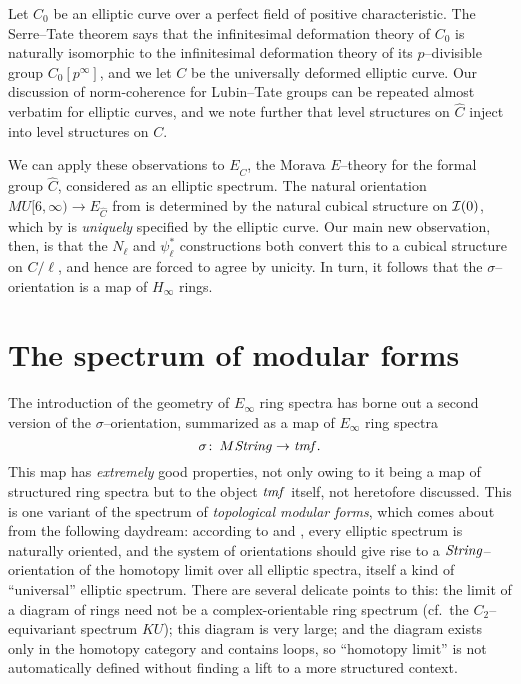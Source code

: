 \begin{example}
Let $C_0$ be an elliptic curve over a perfect field of positive characteristic.  The Serre--Tate theorem says that the infinitesimal deformation theory of $C_0$ is naturally isomorphic to the infinitesimal deformation theory of its $p$--divisible group $C_0[p^\infty]$, and we let $C$ be the universally deformed elliptic curve.  Our discussion of norm-coherence for Lubin--Tate groups can be repeated almost verbatim for elliptic curves, and we note further that level structures on $\widehat C$ inject into level structures on $C$.

We can apply these observations to $E_{\widehat C}$, the Morava $E$--theory for the formal group $\widehat C$, considered as an elliptic spectrum.  The natural orientation $MU[6, \infty) \to E_{\widehat C}$ from  is determined by the natural cubical structure on $\mathcal{I}(0)$, which by  is \emph{uniquely} specified by the elliptic curve.  Our main new observation, then, is that the $N_\ell$ and $\psi_\ell^*$ constructions both convert this to a cubical structure on $C / \ell$, and hence are forced to agree by unicity.  In turn, it follows that the $\sigma$--orientation is a map of $H_\infty$ rings.
\end{example}




















\section{The spectrum of modular forms}\label{ConstructionOfTMFSection}

The introduction of the geometry of $E_\infty$ ring spectra has borne out a second version of the $\sigma$--orientation, summarized as a map of $E_\infty$ ring spectra \[\sigma\colon\thinspace M\mathit{String} \to \mathit{tmf}.\]  This map has \emph{extremely} good properties, not only owing to it being a map of structured ring spectra but to the object $\mathit{tmf}$ itself, not heretofore discussed.  This is one variant of the spectrum of \textit{topological modular forms}, which comes about from the following daydream: according to  and , every elliptic spectrum is naturally oriented, and the system of orientations should give rise to a $\mathit{String}$--orientation of the homotopy limit over all elliptic spectra, itself a kind of ``universal'' elliptic spectrum.  There are several delicate points to this: the limit of a diagram of rings need not be a complex-orientable ring spectrum (cf.\ the $C_2$--equivariant spectrum $KU$); this diagram is very large; and the diagram exists only in the homotopy category and contains loops, so ``homotopy limit'' is not automatically defined without finding a lift to a more structured context.

